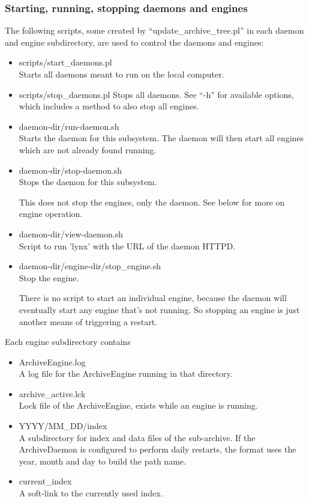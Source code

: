 

\subsubsection{Starting, running, stopping daemons and engines}
The following scripts, some created by ``update\_archive\_tree.pl'' in
each daemon and engine subdirectory, are used to control the daemons
and engines:
\begin{itemize}
\item scripts/start\_daemons.pl\\
      Starts all daemons meant to run on the local computer.
\item scripts/stop\_daemons.pl
      Stops all daemons. See ``-h'' for available options, which
      includes a method to also stop all engines.
\item daemon-dir/run-daemon.sh\\
      Starts the daemon for this subsystem.
      The daemon will then start all engines which are not already
      found running.
\item daemon-dir/stop-daemon.sh\\
      Stops the daemon for this subsystem.

      \NOTE This does not stop the engines, only the daemon.
      See below for more on engine operation.
\item daemon-dir/view-daemon.sh\\
      Script to run 'lynx' with the URL of the daemon HTTPD.
\item daemon-dir/engine-dir/stop\_engine.sh \\
      Stop the engine.

      \NOTE There is no script to start an individual engine, because the
      daemon will eventually start any engine that's not running.
      So stopping an engine is just another means of triggering a
      restart.
\end{itemize}

\noindent Each engine subdirectory contains
\begin{itemize}
\item ArchiveEngine.log\\
  A log file for the ArchiveEngine running in that directory.
\item archive\_active.lck\\
  Lock file of the ArchiveEngine, exists while an engine is running.
\item YYYY/MM\_DD/index \\
  A subdirectory for index and data files of the sub-archive.  If the
  ArchiveDaemon is configured to perform daily restarts, the format
  uses the year, month and day to build the path name.
\item current\_index \\
  A soft-link to the currently used index.
\end{itemize}

